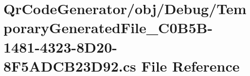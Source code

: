 \hypertarget{_qr_code_generator_2obj_2_debug_2_temporary_generated_file__036_c0_b5_b-1481-4323-8_d20-8_f5_a_d_c_b23_d92_8cs}{}\section{Qr\+Code\+Generator/obj/\+Debug/\+Temporary\+Generated\+File\+\_\+C0\+B5\+B-\/1481-\/4323-\/8\+D20-\/8\+F5\+A\+D\+C\+B23\+D92.cs File Reference}
\label{_qr_code_generator_2obj_2_debug_2_temporary_generated_file__036_c0_b5_b-1481-4323-8_d20-8_f5_a_d_c_b23_d92_8cs}
